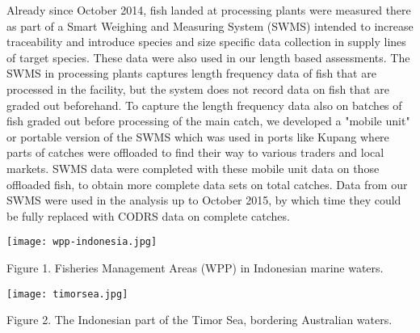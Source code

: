 Already since October 2014, fish landed at processing plants were measured there as part of a Smart Weighing and Measuring System (SWMS) intended to increase traceability and introduce species and size specific data collection in supply lines of target species. These data were also used in our length based assessments. The SWMS in processing plants captures length frequency data of fish that are processed in the facility, but the system does not record data on fish that are graded out beforehand. To capture the length frequency data also on batches of fish graded out before processing of the main catch, we developed a "mobile unit" or portable version of the SWMS which was used in ports like Kupang where parts of catches were offloaded to find their way to various traders and local markets. SWMS data were completed with these mobile unit data on those offloaded fish, to obtain more complete data sets on total catches. Data from our SWMS were used in the analysis up to October 2015, by which time they could be fully replaced with CODRS data on complete catches.

\begin{center}
\graphicspath{{/root/R-project/IFishSnapperWPP573/Images/}}
\texttt{[image: wpp-indonesia.jpg]}

Figure 1. Fisheries Management Areas (WPP) in Indonesian marine waters.
\end{center}

\begin{center}
\graphicspath{{/root/R-project/IFishSnapperWPP573/Images/}}
\texttt{[image: timorsea.jpg]}

Figure 2. The Indonesian part of the Timor Sea, bordering Australian waters.
\end{center}